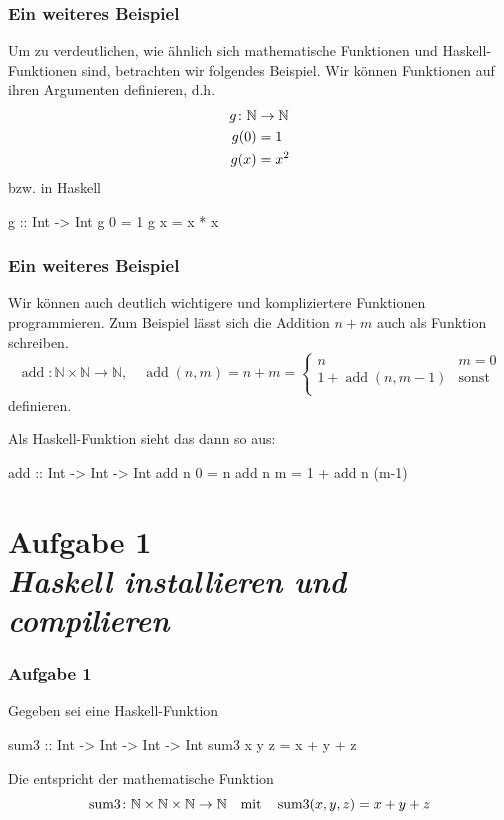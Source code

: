 \documentclass{beamer}
\begin{document}
	\begin{frame}[fragile] \frametitle{Ein weiteres Beispiel}
		\footnotesize
		Um zu verdeutlichen, wie ähnlich sich mathematische Funktionen und Haskell-Funktionen sind, betrachten wir folgendes Beispiel. 
		Wir können Funktionen auf ihren Argumenten definieren, d.h.
		\begin{equation*}
			\begin{split}
				g \colon \mathbb{N} &\to \mathbb{N} \\
				g(0) &= 1 \\
				g(x) &= x^2
			\end{split}
		\end{equation*}
		bzw. in Haskell
		\begin{codebox}
g :: Int -> Int
g 0 = 1
g x = x * x
		\end{codebox}
	\end{frame}

	\begin{frame}[fragile] \frametitle{Ein weiteres Beispiel}
		\footnotesize
		Wir können auch deutlich wichtigere und kompliziertere Funktionen programmieren. Zum Beispiel lässt sich die Addition $n+m$ auch als Funktion schreiben.
		\begin{equation*}
			\operatorname{add} \colon \mathbb{N} \times \mathbb{N} \to \mathbb{N}, \quad
			\operatorname{add}(n,m) = n + m = 
			\begin{cases}
				n & m = 0 \\
				1 + \operatorname{add} ( n , m-1 ) &\text{sonst} \\
			\end{cases}
		\end{equation*}
		definieren.
		
		\medskip \pause
		
		Als Haskell-Funktion sieht das dann so aus:
		\begin{codebox}
add :: Int -> Int -> Int
add n 0 = n
add n m = 1 + add n (m-1)
		\end{codebox}
	\end{frame}
	
	
	\section{Aufgabe 1 \\ \textit{\normalsize Haskell installieren und compilieren}}

	\begin{frame}[fragile] \frametitle{Aufgabe 1}
		Gegeben sei eine Haskell-Funktion
		\begin{codebox}
sum3 :: Int -> Int -> Int -> Int
sum3 x y z = x + y + z
		\end{codebox}
	
		\pause
		
		Die entspricht der mathematische Funktion
		\begin{equation*}
			\operatorname{sum3} \colon \mathbb{N} \times \mathbb{N} \times \mathbb{N} \to \mathbb{N} \quad \text{mit} \quad \operatorname{sum3}(x,y,z) = x + y + z
		\end{equation*}
	\end{frame}
\end{document}
